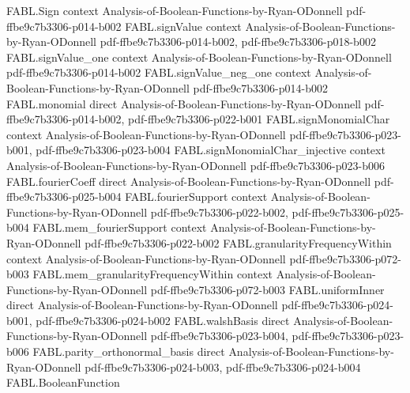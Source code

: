 \begin{theorem}
\label{FABL.eval_krawtchoukGeneratingPolynomial}
\leanok
{}
\proofstep
  {FABL.Sign}
  {context}
  {Analysis-of-Boolean-Functions-by-Ryan-ODonnell}
  {pdf-ffbe9c7b3306-p014-b002}
\proofstep
  {FABL.signValue}
  {context}
  {Analysis-of-Boolean-Functions-by-Ryan-ODonnell}
  {pdf-ffbe9c7b3306-p014-b002,
    pdf-ffbe9c7b3306-p018-b002}
\proofstep
  {FABL.signValue_one}
  {context}
  {Analysis-of-Boolean-Functions-by-Ryan-ODonnell}
  {pdf-ffbe9c7b3306-p014-b002}
\proofstep
  {FABL.signValue_neg_one}
  {context}
  {Analysis-of-Boolean-Functions-by-Ryan-ODonnell}
  {pdf-ffbe9c7b3306-p014-b002}
\proofstep
  {FABL.monomial}
  {direct}
  {Analysis-of-Boolean-Functions-by-Ryan-ODonnell}
  {pdf-ffbe9c7b3306-p014-b002,
    pdf-ffbe9c7b3306-p022-b001}
\proofstep
  {FABL.signMonomialChar}
  {context}
  {Analysis-of-Boolean-Functions-by-Ryan-ODonnell}
  {pdf-ffbe9c7b3306-p023-b001,
    pdf-ffbe9c7b3306-p023-b004}
\proofstep
  {FABL.signMonomialChar_injective}
  {context}
  {Analysis-of-Boolean-Functions-by-Ryan-ODonnell}
  {pdf-ffbe9c7b3306-p023-b006}
\proofstep
  {FABL.fourierCoeff}
  {direct}
  {Analysis-of-Boolean-Functions-by-Ryan-ODonnell}
  {pdf-ffbe9c7b3306-p025-b004}
\proofstep
  {FABL.fourierSupport}
  {context}
  {Analysis-of-Boolean-Functions-by-Ryan-ODonnell}
  {pdf-ffbe9c7b3306-p022-b002,
    pdf-ffbe9c7b3306-p025-b004}
\proofstep
  {FABL.mem_fourierSupport}
  {context}
  {Analysis-of-Boolean-Functions-by-Ryan-ODonnell}
  {pdf-ffbe9c7b3306-p022-b002}
\proofstep
  {FABL.granularityFrequencyWithin}
  {context}
  {Analysis-of-Boolean-Functions-by-Ryan-ODonnell}
  {pdf-ffbe9c7b3306-p072-b003}
\proofstep
  {FABL.mem_granularityFrequencyWithin}
  {context}
  {Analysis-of-Boolean-Functions-by-Ryan-ODonnell}
  {pdf-ffbe9c7b3306-p072-b003}
\proofstep
  {FABL.uniformInner}
  {direct}
  {Analysis-of-Boolean-Functions-by-Ryan-ODonnell}
  {pdf-ffbe9c7b3306-p024-b001,
    pdf-ffbe9c7b3306-p024-b002}
\proofstep
  {FABL.walshBasis}
  {direct}
  {Analysis-of-Boolean-Functions-by-Ryan-ODonnell}
  {pdf-ffbe9c7b3306-p023-b004,
    pdf-ffbe9c7b3306-p023-b006}
\proofstep
  {FABL.parity_orthonormal_basis}
  {direct}
  {Analysis-of-Boolean-Functions-by-Ryan-ODonnell}
  {pdf-ffbe9c7b3306-p024-b003,
    pdf-ffbe9c7b3306-p024-b004}
\proofstep
  {FABL.BooleanFunction}

\end{theorem}
